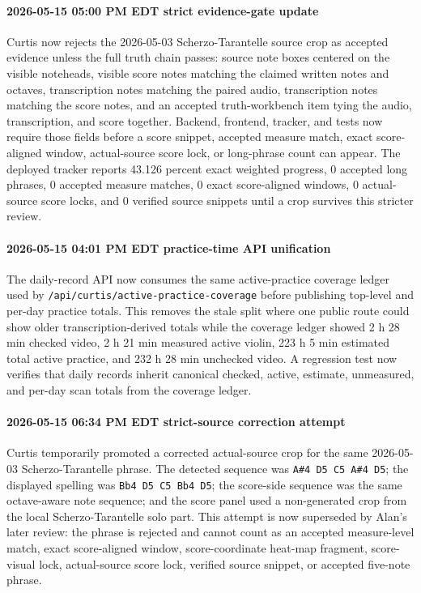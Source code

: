 \paragraph{2026-05-15 05:00 PM EDT strict evidence-gate update} Curtis now rejects the 2026-05-03 Scherzo-Tarantelle source crop as accepted evidence unless the full truth chain passes: source note boxes centered on the visible noteheads, visible score notes matching the claimed written notes and octaves, transcription notes matching the paired audio, transcription notes matching the score notes, and an accepted truth-workbench item tying the audio, transcription, and score together. Backend, frontend, tracker, and tests now require those fields before a score snippet, accepted measure match, exact score-aligned window, actual-source score lock, or long-phrase count can appear. The deployed tracker reports 43.126 percent exact weighted progress, 0 accepted long phrases, 0 accepted measure matches, 0 exact score-aligned windows, 0 actual-source score locks, and 0 verified source snippets until a crop survives this stricter review.

\paragraph{2026-05-15 04:01 PM EDT practice-time API unification} The daily-record API now consumes the same active-practice coverage ledger used by \texttt{/api/curtis/active-practice-coverage} before publishing top-level and per-day practice totals. This removes the stale split where one public route could show older transcription-derived totals while the coverage ledger showed 2 h 28 min checked video, 2 h 21 min measured active violin, 223 h 5 min estimated total active practice, and 232 h 28 min unchecked video. A regression test now verifies that daily records inherit canonical checked, active, estimate, unmeasured, and per-day scan totals from the coverage ledger.

\paragraph{2026-05-15 06:34 PM EDT strict-source correction attempt} Curtis temporarily promoted a corrected actual-source crop for the same 2026-05-03 Scherzo-Tarantelle phrase. The detected sequence was \texttt{A\#4 D5 C5 A\#4 D5}; the displayed spelling was \texttt{Bb4 D5 C5 Bb4 D5}; the score-side sequence was the same octave-aware note sequence; and the score panel used a non-generated crop from the local Scherzo-Tarantelle solo part. This attempt is now superseded by Alan's later review: the phrase is rejected and cannot count as an accepted measure-level match, exact score-aligned window, score-coordinate heat-map fragment, score-visual lock, actual-source score lock, verified source snippet, or accepted five-note phrase.


